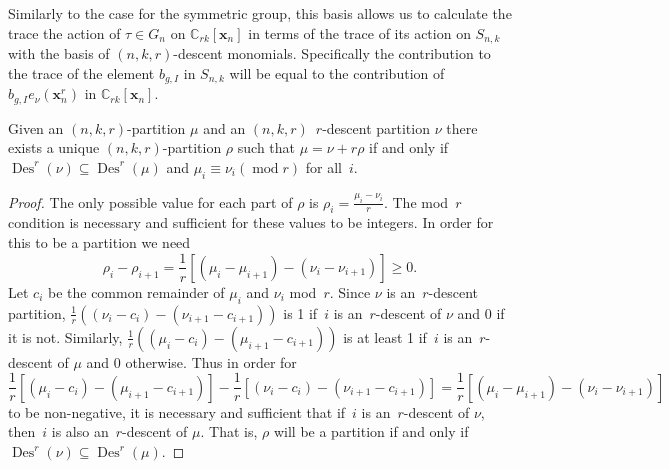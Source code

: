 \documentclass[ALCO,ThmDefs,Unicode,epreuves]{cedram}
\DeclareMathOperator{\modrm}{mod}
\DeclareMathOperator{\Des}{Des}
\begin{document}
Similarly to the case for the symmetric group, this basis allows us to calculate the trace the action of $\tau\in G_n$ on $ 
\mathbb{C}_{rk}[\mathbf{x}_n]$ in terms of the trace of its action on $S_{n,k}$ with the basis of $(n,k,r)$-descent monomials. 
Specifically the contribution to the trace of the element $b_{g,I}$ in $S_{n,k}$ will be equal to the contribution of 
$b_{g,I}e_\nu(\mathbf{x}_n^r)$ in $\mathbb{C}_{rk}[\mathbf{x}_n]$.


























	
\begin{lemm}

\label{DecomLem2}
 Given an $(n,k,r)$-partition $\mu$ and an $(n,k,r)$~$r$-descent partition $\nu$ there exists a unique $(n,k,r)$-partition 
$\rho$ such that $\mu=\nu+r\rho$ if and only if $\Des ^r(\nu)\subseteq \Des ^r(\mu)$ and $\mu_i\equiv \nu_i (\modrm r)$ for 
all~$i$.

	\begin{proof}
		The only possible value for each part of $\rho$ is $\rho_i=\frac{\mu_i-\nu_i}{r}$. The mod~$r$ condition is necessary 
and sufficient for these values to be integers. In order for this to be a partition we 
need
\begin{equation}
\rho_i-\rho_{i+1}=\frac{1}{r}[(\mu_i-\mu_{i+1})-(\nu_i-\nu_{i+1})]\geq 0.
\end{equation}
 Let $c_i$ 
be the common remainder of $\mu_i$ and $\nu_i$ mod~$r$. Since $\nu$ is an~$r$-descent partition, 
$\frac{1}{r}((\nu_i-c_i)-(\nu_{i+1}-c_{i+1}))$ is 1 if~$i$ is an~$r$-descent of $\nu$ and 0 if it is not. Similarly, 
$\frac{1}{r}((\mu_i-c_i)-(\mu_{i+1}-c_{i+1}))$ is at least 1 if~$i$ is an~$r$-descent of $\mu$ and 0 otherwise. Thus 
in order 
for
\begin{equation}
\frac{1}{r}[(\mu_i-c_i)-(\mu_{i+1}-c_{i+1})]-\frac{1}{r}[(\nu_i-c_i)-(\nu_{i+1}-c_{i+1})]=\frac{1}{r}[
(\mu_i-\mu_{i+1})-(\nu_i-\nu_{i+1})]
\end{equation}
to be non-negative, it is necessary and sufficient that if~$i$ is an~$r$-descent of $\nu$, then~$i$ is also an~$r$-descent of $\mu$. That is, $\rho$ will be a partition if and only if 
$\Des ^r(\nu)\subseteq \Des ^r(\mu)$.
	\end{proof}
\end{lemm}
\end{document}
